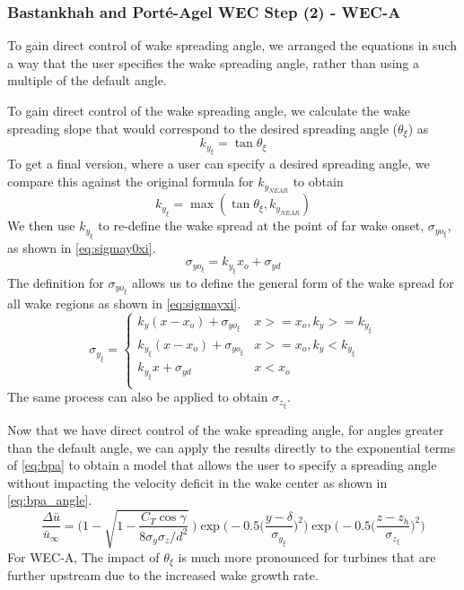 \documentclass[a4paper]{jpconf}
\begin{document}
\subsubsection{Bastankhah and Port\'e-Agel WEC Step (2) - WEC-A}
 To gain direct control of wake spreading angle, we arranged the equations in such a way that the user specifies the wake spreading angle, rather than using a multiple of the default angle. 

To gain direct control of the wake spreading angle, we calculate the wake spreading slope that would correspond to the desired spreading angle ($\theta_\xi$) as
%
\begin{equation}
k_{y_{\xi}} = \tan{\theta_\xi}
\end{equation}
%
To get a final version, where a user can specify a desired spreading angle, we compare this against the original formula for $k_{y_{NEAR}}$ to obtain
%
\begin{equation}
k_{y_{\xi}} = \max(\tan{\theta_\xi}, k_{y_{NEAR}})
\end{equation}
%
We then use $k_{y_{\xi}}$ to re-define the wake spread at the point of far wake onset, $\sigma_{yo_{\xi}}$, as shown in \cref{eq:sigmay0xi}.
%
\begin{equation}\label{eq:sigmay0xi}
\sigma_{yo_{\xi}} = k_{y_{\xi}}x_o+\sigma_{yd}
\end{equation}
%
The definition for $\sigma_{yo_{\xi}}$ allows us to define the general form of the wake spread for all wake regions as shown in \cref{eq:sigmayxi}. 
%
\begin{equation}\label{eq:sigmayxi}
\sigma_{y_{\xi}} =
\begin{cases} k_y (x-x_o)+\sigma_{yo_{\xi}} & x >= x_o, k_y >= k_{y_{\xi}} \\
k_{y_{\xi}} (x-x_o)+\sigma_{yo_{\xi}} & x >= x_o, k_y < k_{y_{\xi}} \\
k_{y_{\xi}}x+\sigma_{yd} & x < x_o \\
\end{cases}
\end{equation}
%
The same process can also be applied to obtain $\sigma_{z_{\xi}}$. 

Now that we have direct control of the wake spreading angle, for angles greater than the default angle, we can apply the results directly to the exponential terms of \cref{eq:bpa} to obtain  a model that allows the user to specify a spreading angle without impacting the velocity deficit in the wake center as shown in \cref{eq:bpa_angle}.
\begin{equation}
\frac{\Delta \bar{u}}{\bar{u}_{\infty}} = \Bigg(1-\sqrt{1-\frac{C_T \cos{\gamma}}{8 \sigma_y \sigma_z/d^2}}~\Bigg) \exp{\bigg(-0.5\Big(\frac{y-\delta}{\sigma_{y_{\xi}}}\Big)^2\bigg)}\exp{\bigg(-0.5\Big(\frac{z-z_h}{\sigma_{z_{\xi}}}\Big)^2\bigg)}
\label{eq:bpa_angle}
\end{equation}
%
For WEC-A, The impact of $\theta_\xi$ is much more pronounced for turbines that are further upstream due to the increased wake growth rate. 
\end{document}
